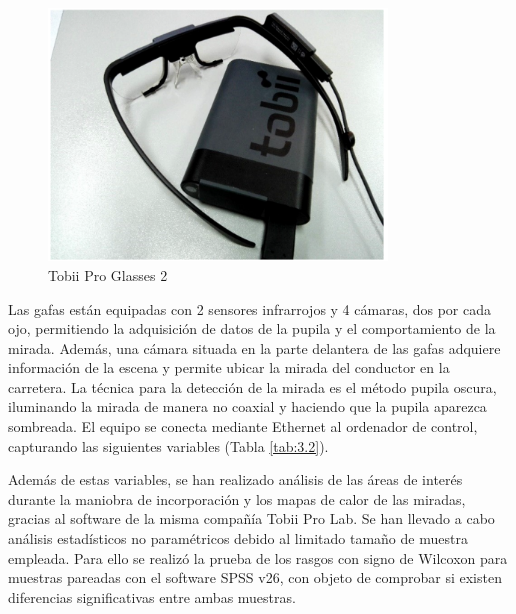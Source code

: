 \begin{figure}[h]
    \centering
    \includegraphics[width=9cm]{figures/3.2.png}
    \caption{ \label{fig:3.2} Tobii Pro Glasses 2}
\end{figure}

Las gafas están equipadas con 2 sensores infrarrojos y 4 cámaras, dos por cada ojo, permitiendo la adquisición de datos de la pupila y el comportamiento de la mirada. Además, una cámara situada en la parte delantera de las gafas adquiere información de la escena y permite ubicar la mirada del conductor en la carretera. La técnica para la detección de la mirada es el método pupila oscura, iluminando la mirada de manera no coaxial y haciendo que la pupila aparezca sombreada. El equipo se conecta mediante Ethernet al ordenador de control, capturando las siguientes variables (Tabla \ref{tab:3.2}).

Además de estas variables, se han realizado análisis de las áreas de interés durante la maniobra de incorporación y los mapas de calor de las miradas, gracias al software de la misma compañía Tobii Pro Lab.
Se han llevado a cabo análisis estadísticos no paramétricos debido al limitado tamaño de muestra empleada. Para ello se realizó la prueba de los rasgos con signo de Wilcoxon para muestras pareadas con el software SPSS v26, con objeto de comprobar si existen diferencias significativas entre ambas muestras. 

